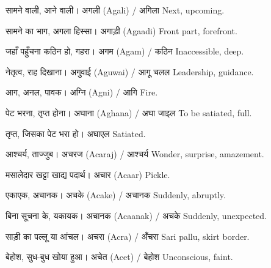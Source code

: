 %
{सामने वाली, आने वाली।}%
{अगली (Agali) / अगिला}%
{Next, upcoming.}

%
{सामने का भाग, अगला हिस्सा।}%
{अगाड़ी (Agaadi)}%
{Front part, forefront.}

%
{जहाँ पहुँचना कठिन हो, गहरा।}%
{अगम (Agam) / कठिन}%
{Inaccessible, deep.}

%
{नेतृत्व, राह दिखाना।}%
{अगुवाई (Aguwai) / आगू चलल}%
{Leadership, guidance.}

%
{आग, अनल, पावक।}%
{अग्नि (Agni) / आगि}%
{Fire.}

%
{पेट भरना, तृप्त होना।}%
{अघाना (Aghana) / अघा जाइल}%
{To be satiated, full.}

%
{तृप्त, जिसका पेट भरा हो।}%
{अघाएल}%
{Satiated.}

%
{आश्चर्य, ताज्जुब।}%
{अचरज (Acaraj) / आश्चर्य}%
{Wonder, surprise, amazement.}

%
{मसालेदार खट्टा खाद्य पदार्थ।}%
{अचार (Acaar)}%
{Pickle.}

%
{एकाएक, अचानक।}%
{अचके (Acake) / अचानक}%
{Suddenly, abruptly.}

%
{बिना सूचना के, यकायक।}%
{अचानक (Acaanak) / अचके}%
{Suddenly, unexpected.}

%
{साड़ी का पल्लू या आंचल।}%
{अचरा (Acra) / अँचरा}%
{Sari pallu, skirt border.}

%
{बेहोश, सुध-बुध खोया हुआ।}%
{अचेत (Acet) / बेहोश}%
{Unconscious, faint.}


